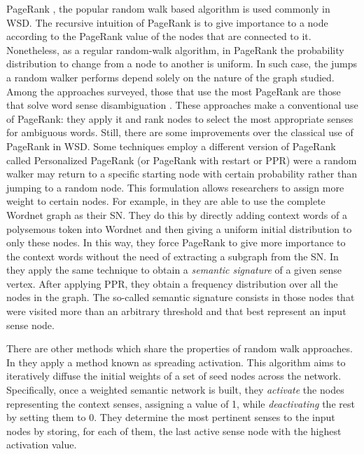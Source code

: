 PageRank \cite{Brin1998}, the popular random walk based algorithm is used commonly in WSD. The recursive intuition of PageRank is to give importance to a node according to the PageRank value of the nodes that are connected to it. %
Nonetheless, as a regular random-walk algorithm, in PageRank the probability distribution to change from a node to another is uniform. In such case, the jumps a random walker performs depend solely on the nature of the graph studied. Among the approaches surveyed, those that use the most PageRank are those that solve word sense disambiguation \cite{2004.Mihalcea.SemanticNetworkPageRank,2006.Agirre.TwoGraph-basedAlgorithms,2007.Navigli.GraphConnectivity,2010.Siberer.GraphCooccurrenceWSD}. 
%
These approaches make a conventional use of PageRank: they apply it and rank nodes to select the most appropriate senses for ambiguous words. Still, there are some improvements over the classical use of PageRank in WSD. Some techniques employ a different version of PageRank called Personalized PageRank (or PageRank with restart \cite{Murphy2012} or PPR) were a random walker may return to a specific starting node with certain probability rather than jumping to a random node. This formulation allows researchers to assign more weight to certain nodes. For example, in \cite{2009.Agirre.PersonalizedPageRankWSD} they are able to use the complete Wordnet graph as their SN. They do this by directly adding context words of a polysemous token into Wordnet and then giving a uniform initial distribution to only these nodes. In this way, they force PageRank to give more importance to the context words without the need of extracting a subgraph from the SN. In \cite{2014.Moro.Navigli.EntityLinking_WSD} they apply the same technique to obtain a \textit{semantic signature} of a given sense vertex. After applying PPR, they obtain a frequency distribution over all the  nodes in the graph. The so-called semantic signature consists in those nodes that were visited more than an arbitrary threshold and that best represent an input sense node.

There are other methods which share the properties of random walk approaches. In  \cite{2007.Tsatsaronis.WSDwithSpreading,2013.Kivimaki.AGraph-BasedApproach} they apply a method known as spreading activation. This algorithm aims to iteratively diffuse the initial weights of a set of seed nodes across the network. Specifically, once a weighted semantic network is built, they \textit{activate}  the nodes representing the context senses, assigning a value of 1, while \textit{deactivating} the rest by setting them to 0. They determine the most pertinent senses to the input nodes by storing, for each of them, the last active sense node with the highest activation value. 


